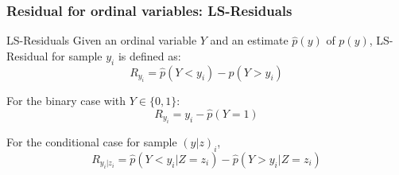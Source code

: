 \documentclass{beamer}
\begin{document}
\begin{frame}
	\frametitle{Residual for ordinal variables: LS-Residuals}
	\begin{block}{LS-Residuals}
	Given an ordinal variable $ Y $ and an estimate $ \hat{p}(y) $ of $
	p(y) $, LS-Residual for sample $ y_i $ is defined as:
	$$ R_{y_i} = \hat{p}(Y < y_i) - \hat{p}(Y > y_i) $$
	\end{block}

	For the binary case with $ Y \in \{0, 1\} $:
	$$ R_{y_i} = y_i - \hat{p}(Y = 1) $$

	For the conditional case for sample $ (y|z)_i $,
	$$ R_{y_i | z_i} = \hat{p}(Y < y_i | Z=z_i) - \hat{p}(Y>y_i|Z=z_i) $$

\end{frame}

\end{document}
